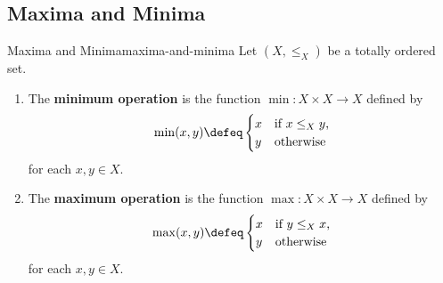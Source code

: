 \subsection{Maxima and Minima}\label{subsection-maxima-and-minima}
\begin{definition}{Maxima and Minima}{maxima-and-minima}%
    Let $(X,\leq_{X})$ be a totally ordered set.
    \begin{enumerate}
        \item\label{maxima-and-minima-minima}The \textbf{minimum operation} is the function $\min\colon X\times X\to X$ defined by
            \[
                \min(x,y)%
                \defeq%
                \begin{cases}%
                    x &\text{if $x\leq_{X}y$,}\\
                    y &\text{otherwise}%
                \end{cases}%
            \]%
            for each $x,y\in X$.
        \item\label{maxima-and-minima-maxima}The \textbf{maximum operation} is the function $\max\colon X\times X\to X$ defined by
            \[
                \max(x,y)%
                \defeq%
                \begin{cases}%
                    x &\text{if $y\leq_{X}x$,}\\
                    y &\text{otherwise}%
                \end{cases}%
            \]%
            for each $x,y\in X$.
    \end{enumerate}
\end{definition}
